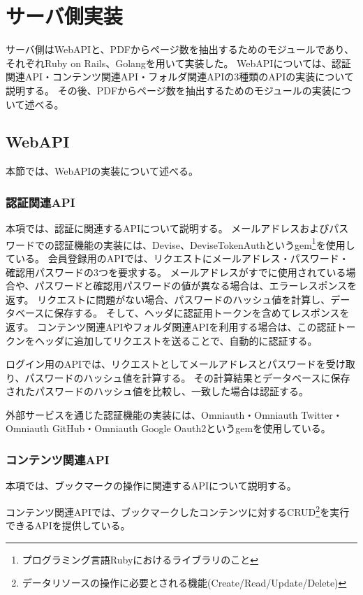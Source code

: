 \section{サーバ側実装}
サーバ側はWebAPIと、PDFからページ数を抽出するためのモジュールであり、それぞれRuby on Rails、Golangを用いて実装した。
WebAPIについては、認証関連API・コンテンツ関連API・フォルダ関連APIの3種類のAPIの実装について説明する。
その後、PDFからページ数を抽出するためのモジュールの実装について述べる。

\subsection{WebAPI}
本節では、WebAPIの実装について述べる。

\subsubsection{認証関連API}
本項では、認証に関連するAPIについて説明する。
メールアドレスおよびパスワードでの認証機能の実装には、Devise\cite{devise}、DeviseTokenAuth\cite{devise-token-auth}というgem\footnote{プログラミング言語Rubyにおけるライブラリのこと}を使用している。
会員登録用のAPIでは、リクエストにメールアドレス・パスワード・確認用パスワードの3つを要求する。
メールアドレスがすでに使用されている場合や、パスワードと確認用パスワードの値が異なる場合は、エラーレスポンスを返す。
リクエストに問題がない場合、パスワードのハッシュ値を計算し、データベースに保存する。
そして、ヘッダに認証用トークンを含めてレスポンスを返す。
コンテンツ関連APIやフォルダ関連APIを利用する場合は、この認証トークンをヘッダに追加してリクエストを送ることで、自動的に認証する。

ログイン用のAPIでは、リクエストとしてメールアドレスとパスワードを受け取り、パスワードのハッシュ値を計算する。
その計算結果とデータベースに保存されたパスワードのハッシュ値を比較し、一致した場合は認証する。

外部サービスを通じた認証機能の実装には、Omniauth\cite{omniauth}・Omniauth Twitter\cite{omniauth-twitter}・Omniauth GitHub\cite{omniauth-github}・Omniauth Google Oauth2\cite{omniauth-google-oauth2}というgemを使用している。

\subsubsection{コンテンツ関連API}
本項では、ブックマークの操作に関連するAPIについて説明する。


コンテンツ関連APIでは、ブックマークしたコンテンツに対するCRUD\footnote{データリソースの操作に必要とされる機能(Create/Read/Update/Delete)}を実行できるAPIを提供している。

